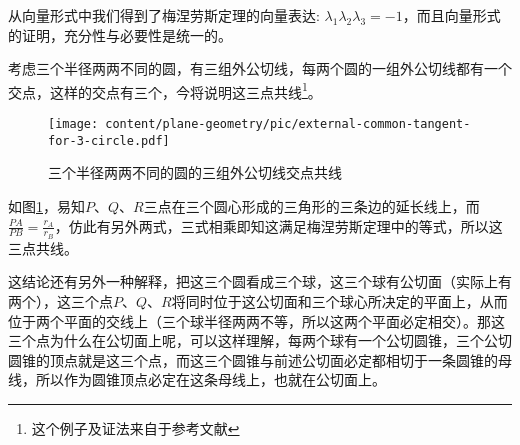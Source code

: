 从向量形式中我们得到了梅涅劳斯定理的向量表达: $\lambda_1\lambda_2\lambda_3=-1$，而且向量形式的证明，充分性与必要性是统一的。

\begin{example}
  \label{example:external-common-tangent-for-3-circle}
  考虑三个半径两两不同的圆，有三组外公切线，每两个圆的一组外公切线都有一个交点，这样的交点有三个，今将说明这三点共线\footnote{这个例子及证法来自于参考文献\cite{kuing-problem-elementary-math-note}}。
 
\begin{figure}[htbp]
\centering
\texttt{[image: content/plane-geometry/pic/external-common-tangent-for-3-circle.pdf]}
\caption{三个半径两两不同的圆的三组外公切线交点共线}
\label{fig:external-common-tangent-for-3-circle}
\end{figure}

如图\ref{fig:external-common-tangent-for-3-circle}，易知$P$、$Q$、$R$三点在三个圆心形成的三角形的三条边的延长线上，而$\frac{PA}{PB}=\frac{r_A}{r_B}$，仿此有另外两式，三式相乘即知这满足梅涅劳斯定理中的等式，所以这三点共线。

 这结论还有另外一种解释，把这三个圆看成三个球，这三个球有公切面（实际上有两个），这三个点$P$、$Q$、$R$将同时位于这公切面和三个球心所决定的平面上，从而位于两个平面的交线上（三个球半径两两不等，所以这两个平面必定相交）。那这三个点为什么在公切面上呢，可以这样理解，每两个球有一个公切圆锥，三个公切圆锥的顶点就是这三个点，而这三个圆锥与前述公切面必定都相切于一条圆锥的母线，所以作为圆锥顶点必定在这条母线上，也就在公切面上。
\end{example}

